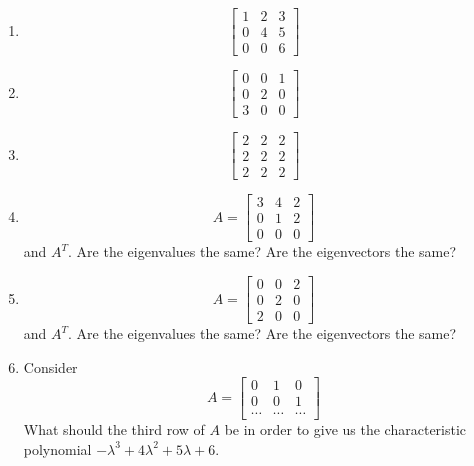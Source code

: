 \documentclass[14pt]{amsart}
\begin{document}
\begin{enumerate}
\begin{enumerate}
\item
%
\begin{equation*}
\begin{bmatrix}
1 & 2 & 3\\
0 & 4 & 5\\
0 & 0 & 6
\end{bmatrix}
\end{equation*}

\item
%
\begin{equation*}
\begin{bmatrix}
0 & 0 & 1\\
0 & 2 & 0\\
3 & 0 & 0
\end{bmatrix}
\end{equation*}

\item
%
\begin{equation*}
\begin{bmatrix}
2 & 2 & 2\\
2 & 2 & 2\\
2 & 2 & 2
\end{bmatrix}
\end{equation*}

\item
%
\begin{equation*}
A = \begin{bmatrix}
3 & 4 & 2\\
0 & 1 & 2\\
0 & 0 & 0
\end{bmatrix}
\end{equation*} and $A^T$.  Are the eigenvalues the same?  Are the eigenvectors the same?

\item  
%
\begin{equation*}
A = \begin{bmatrix}
0 & 0 & 2\\
0 & 2 & 0\\
2 & 0 & 0
\end{bmatrix}
\end{equation*} and $A^T$.  Are the eigenvalues the same?  Are the eigenvectors the same?

\item  Consider
%
\begin{equation*}
A = \begin{bmatrix}
0 & 1 & 0\\
0 & 0 & 1\\
\cdots & \cdots & \cdots
\end{bmatrix}
\end{equation*}
%
What should the third row of $A$ be in order to give us the characteristic polynomial
$-\lambda^3 + 4\lambda^2 + 5\lambda + 6$.


\end{enumerate}
\end{enumerate}
\end{document}
